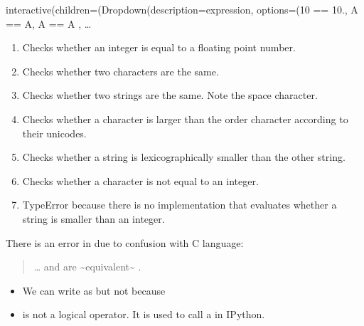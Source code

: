 \documentclass[letterpaper,10pt,english]{sphinxmanual}
\begin{document}
\begin{sphinxVerbatim}[commandchars=\\\{\}]
interactive(children=(Dropdown(description=\PYGZsq{}expression\PYGZsq{}, options=(\PYGZsq{}10 == 10.\PYGZsq{}, \PYGZsq{}\PYGZdq{}A\PYGZdq{} == \PYGZdq{}A\PYGZdq{}\PYGZsq{}, \PYGZsq{}\PYGZdq{}A\PYGZdq{} == \PYGZdq{}A \PYGZdq{}\PYGZsq{}, \PYGZsq{}\PYGZdq{}…
\end{sphinxVerbatim}
\begin{enumerate}
%
\item {} 
Checks whether an integer is equal to a floating point number.

\item {} 
Checks whether two characters are the same.

\item {} 
Checks whether two strings are the same. Note the space character.

\item {} 
Checks whether a character is larger than the order character according to their unicodes.

\item {} 
Checks whether a string is lexicographically smaller than the other string.

\item {} 
Checks whether a character is not equal to an integer.

\item {} 
TypeError because there is no implementation that evaluates whether a string is smaller than an integer.

\end{enumerate}


 There is an error in  due to confusion with C language:
\begin{quote}

…  and  are \textasciitilde{}equivalent\textasciitilde{} .
\end{quote}
\begin{itemize}
\item {} 
We can write  as  but not  because

\item {} 
\sphinxcode{\sphinxupquote{!}} is not a logical operator. It is used to call a  in IPython.

\end{itemize}
\end{document}
